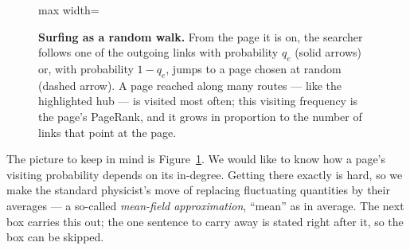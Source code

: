 \begin{figure}[t]
\centering
\begin{adjustbox}{max width=\linewidth}\end{adjustbox}
\caption{\textbf{Surfing as a random walk.} From the page it is on, the searcher
follows one of the outgoing links with probability $q_e$ (solid arrows) or, with
probability $1-q_e$, jumps to a page chosen at random (dashed arrow). A page
reached along many routes --- like the highlighted hub --- is visited most often;
this visiting frequency is the page's PageRank, and it grows in proportion to the
number of links that point at the page.}
\label{fig:walk-surf}
\end{figure}

The picture to keep in mind is Figure~\ref{fig:walk-surf}. We would like to know
how a page's visiting probability depends on its
in-degree. Getting there exactly is hard, so we make the standard physicist's
move of replacing fluctuating quantities by their averages --- a so-called
\emph{mean-field approximation}, ``mean'' as in average. The next box carries
this out; the one sentence to carry away is stated right after it, so the box
can be skipped.

